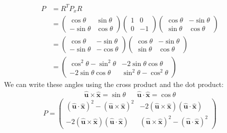 \documentclass[12pt]{article}
\begin{document}
\begin{equation}
	\begin{split}
		P &= R^T P_x R\\
		   &= \left(\begin{matrix}\cos \theta & \sin \theta \\ -\sin \theta & \cos \theta\end{matrix}\right)
		\left(\begin{matrix}1 & 0 \\ 0 & -1\end{matrix}\right)
		\left(\begin{matrix}\cos \theta&  -\sin \theta \\ \sin\theta &\cos\theta \end{matrix}\right) \\
					       &= \left(\begin{matrix} \cos\theta & -\sin\theta \\ -\sin \theta & -\cos \theta \end{matrix}\right)\left(\begin{matrix}\cos \theta&  -\sin \theta \\ \sin\theta &\cos\theta \end{matrix}\right)\\
					       &= \left(\begin{matrix} \cos^2\theta-\sin^2\theta & -2\sin\theta\cos\theta \\ -2\sin \theta\cos\theta & \sin^2 \theta-\cos^2\theta \end{matrix}\right)
	\end{split}
\end{equation}
We can write these angles using the cross product and the dot product:
\begin{align}
	\mathbf{\hat u}\times \mathbf{\hat x} = \sin \theta && \mathbf{\hat u} \cdot \mathbf{\hat x} = \cos \theta
\end{align}
\begin{equation}
	P = \left(\begin{matrix}(\mathbf{\hat u}\cdot \mathbf{\hat x})^2-(\mathbf{\hat u}\times \mathbf{\hat x})^2 & -2(\mathbf{\hat u}\times\mathbf{\hat x})(\mathbf{\hat u}\cdot\mathbf{\hat x}) \\
	-2(\mathbf{\hat u}\times\mathbf{\hat x})(\mathbf{\hat u}\cdot\mathbf{\hat x}) & 
	(\mathbf{\hat u}\times \mathbf{\hat x})^2 - (\mathbf{\hat u}\cdot \mathbf{\hat x})^2\end{matrix}\right)
\end{equation}
\end{document}
